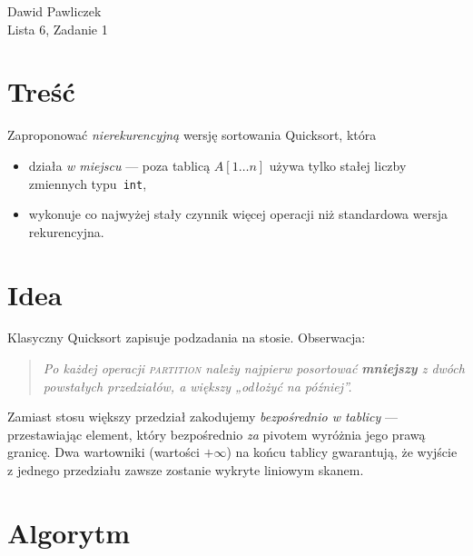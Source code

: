 \documentclass[11pt,a4paper]{article}
\begin{document}
\begin{center}
\Large Dawid Pawliczek\\
Lista 6, Zadanie 1
\end{center}

\bigskip
\section*{Treść}

Zaproponować \emph{nierekurencyjną} wersję sortowania Quick\-sort, która

\begin{itemize}
\item działa \emph{w miejscu} — poza tablicą $A[1\dots n]$ używa tylko
      stałej liczby zmiennych typu~\texttt{int},
\item wykonuje co najwyżej stały czynnik więcej operacji
      niż standardowa wersja rekurencyjna.
\end{itemize}

\section*{Idea}

Klasyczny Quick\-sort zapisuje podzadania na stosie.
Obserwacja:

\begin{quote}
\emph{Po każdej operacji \textsc{partition}
 należy najpierw posortować \textbf{mniejszy} z dwóch
 powstałych przedziałów, a większy „odłożyć na później”.}
\end{quote}

Zamiast stosu większy przedział zakodujemy
\emph{bezpośrednio w tablicy} — przestawiając element,
który bezpośrednio \emph{za} pivotem wyróżnia jego prawą granicę.
Dwa wartowniki (wartości $+\infty$) na końcu tablicy
gwarantują, że wyjście z jednego przedziału
zawsze zostanie wykryte liniowym skanem.

\section*{Algorytm}
\end{document}
